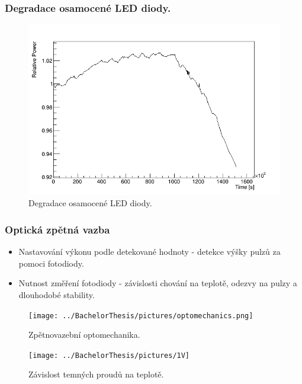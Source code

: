 \documentclass{beamer}
\begin{document}
\begin{frame}
\frametitle{Degradace osamocené LED diody.}
 \begin{figure}[H]
 \centering
 \includegraphics[scale=0.4, angle = 0, origin = c]{corrected1}
 \caption{Degradace osamocené LED diody.}
 \label{UVsource}
\end{figure}


\end{frame}



\begin{frame}
\frametitle{Optická zpětná vazba}


\begin{itemize}
 \item Nastavování výkonu podle detekované hodnoty - detekce výšky pulzů za pomoci fotodiody.
 \item Nutnost změření fotodiody - závislosti chování na teplotě, odezvy na pulzy a dlouhodobé stability.


\end{itemize}


 \begin{figure}[H]
 \centering
 \texttt{[image: ../BachelorThesis/pictures/optomechanics.png]}
 \caption{Zpětnovazební optomechanika.}
 \label{UVsource}
\end{figure}


\end{frame}


\begin{frame}

 \begin{figure}[H]
 \centering
 \texttt{[image: ../BachelorThesis/pictures/1V]}
 \caption{Závislost temných proudů na teplotě.}
 \label{UVsource}
\end{figure}


\end{frame}
\end{document}
